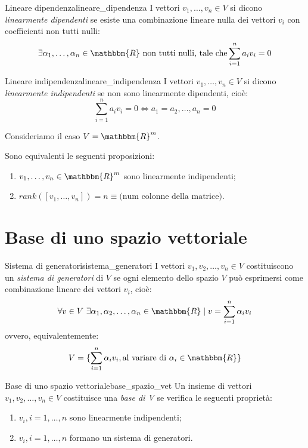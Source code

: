 \documentclass[12pt]{report}
\newcounter{definition}
\newcounter{proposition}
\newcommand{\nmu}{}
\begin{document}
\begin{definition}{\nmu Lineare dipendenza}{lineare_dipendenza}
	I vettori $v_1, \dots, v_n \in V$ si dicono \textit{linearmente dipendenti} se esiste una combinazione lineare nulla dei vettori $v_i$ con coefficienti non tutti nulli:
	\[
	\exists \alpha_1, \dots, \alpha_n \in \mathbbm{R} \text{ non tutti nulli, tale che} \displaystyle\sum_{i=1}^{n}a_iv_i = 0
	\]
\end{definition}
\begin{definition}{\nmu Lineare indipendenza}{lineare_indipendenza}
	I vettori $v_1, \dots, v_n \in V$ si dicono \textit{linearmente indipendenti} se  non sono linearmente dipendenti, cioè:
	\[
	\displaystyle\sum_{i=1}^{n}a_iv_i = 0 \iff a_1 = a_2,\dots,a_n = 0
	\]
\end{definition}
Consideriamo il caso $V = \mathbbm{R}^m$.
\begin{proposition}{}{}
	Sono equivalenti le seguenti proposizioni:
	\begin{enumerate}
		\item $v_1, \dots, v_n \in \mathbbm{R}^m$ sono linearmente indipendenti;
		\item $rank([v_1, \dots, v_n]) = n \equiv \text{(num colonne della matrice)}$.
	\end{enumerate}
\end{proposition}
\section{Base di uno spazio vettoriale}
\begin{definition}{\nmu Sistema di generatori}{sistema_generatori}
	I vettori $v_1, v_2, \dots, v_n \in V$ costituiscono un \textit{sistema di generatori} di $V$ se ogni elemento dello spazio $V$ può esprimersi come combinazione lineare dei vettori $v_i$, cioè:
	\[
	\forall v \in V\ \exists \alpha_1, \alpha_2, \dots, \alpha_n \in \mathbbm{R} \mid v = \displaystyle\sum_{i=1}^{n}\alpha_iv_i
	\]
	ovvero, equivalentemente:
	\[
	V = \{\displaystyle\sum_{i=1}^{n}\alpha_i v_i, \text{al variare di }\alpha_i \in \mathbbm{R}\}
	\]
\end{definition}
\begin{definition}{\nmu Base di uno spazio vettoriale}{base_spazio_vet}
	Un insieme di vettori $v_1, v_2, \dots, v_n \in V$ costituisce una \textit{base di V} se verifica le seguenti proprietà:
	\begin{enumerate}
		\item $v_i, i = 1, \dots, n$ sono linearmente indipendenti;
		\item $v_i, i = 1, \dots, n$ formano un sistema di generatori.
	\end{enumerate}
\end{definition}
\end{document}
